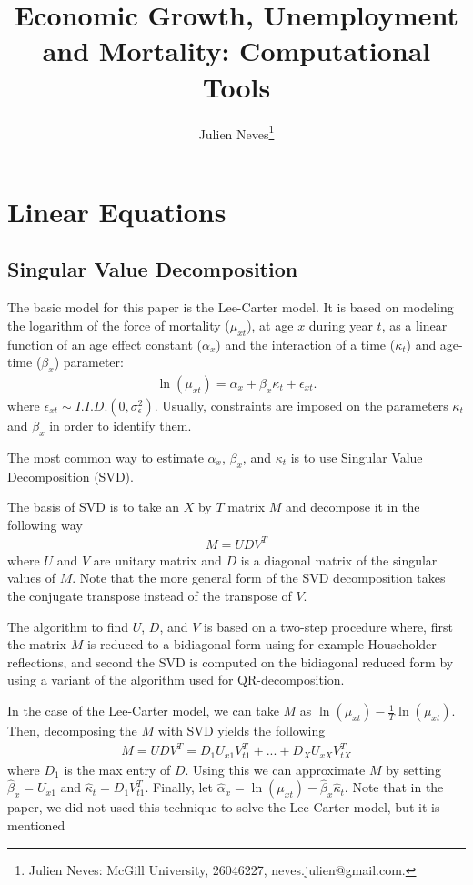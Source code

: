 \documentclass[]{article}
\title{Economic Growth, Unemployment and Mortality: Computational Tools}
\author{Julien Neves\thanks{Julien Neves: McGill University, 26046227, neves.julien@gmail.com.}}
\begin{document}
\maketitle

\section{Linear Equations}
\subsection{Singular Value Decomposition}

The basic model for this paper is the Lee-Carter model. It is based on modeling the logarithm of the force of mortality ($\mu_{xt}$), at age $x$ during year $t$, as a linear function of an age effect constant ($\alpha_x$) and the interaction of a time ($\kappa_t$) and age-time ($\beta_x$) parameter:
\begin{align}\label{eq:lee-carter}
\ln(\mu_{xt})=\alpha_x+\beta_x\kappa_t+\epsilon_{xt}.
\end{align} 
where $\epsilon_{xt} \sim I.I.D.(0,\sigma_\epsilon^2)$. Usually, constraints are imposed on the parameters $\kappa_t$ and $\beta_x$ in order to identify them.

The most common way to estimate $\alpha_x$, $\beta_x$, and $\kappa_t$ is to use Singular Value Decomposition (SVD).

The basis of SVD is to take an $X$ by $T$ matrix $M$ and decompose it in the following way
\begin{align}
	M = UDV^T
\end{align}
where $U$ and $V$ are unitary matrix and $D$ is a diagonal matrix of the singular values of $M$. Note that the more general form of the SVD decomposition takes the conjugate transpose instead of the transpose of $V$.

The algorithm to find $U$, $D$, and $V$ is based on a two-step procedure where, first the matrix $M$ is reduced to a bidiagonal form using for example Householder reflections, and second the SVD is computed on the bidiagonal reduced form by using a variant of the algorithm used for QR-decomposition.

In the case of the Lee-Carter model, we can take $M$ as $\ln(\mu_{xt})- \frac{1}{T}\ln(\mu_{xt})$. Then, decomposing the $M$ with SVD yields the following
\begin{align}
M = UDV^T = D_1U_{x1}V_{t1}^T + ... + D_XU_{xX}V_{tX}^T
\end{align}
where $D_1$ is the max entry of $D$. Using this we can approximate $M$ by setting $\hat{\beta}_x= U_{x1}$ and $\hat{\kappa}_t = D_1V_{t1}^T$. Finally, let $\hat{\alpha}_x = \ln(\mu_{xt}) - \hat{\beta}_x\hat{\kappa}_t$. Note that in the paper, we did not used this technique to solve the Lee-Carter model, but it is mentioned
\end{document}
